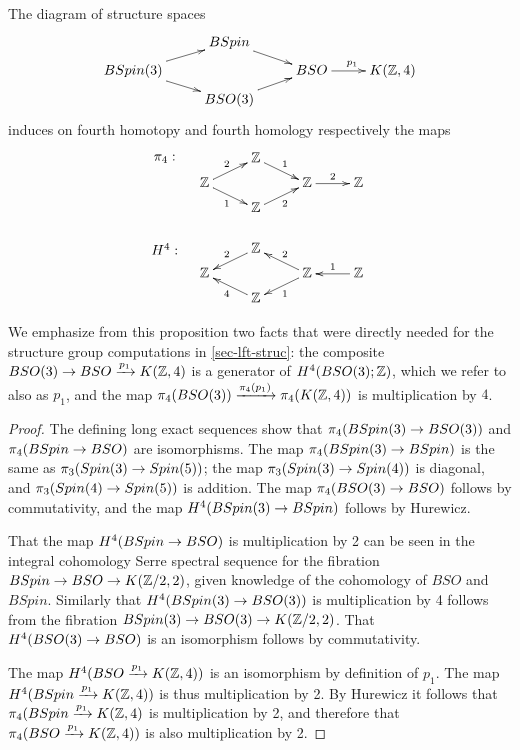 \documentclass{amsart}
\begin{document}
\begin{proposition} 
\label{prop-H4}
The diagram of structure spaces
\[
\xymatrix@R=5pt{
& BSpin \ar[dr] & & \\
BSpin(3) \ar[ur] \ar[dr] && BSO \ar[r]^{p_1} & K(\ZZ,4) \\
& BSO(3) \ar[ur] & &
}
\]
induces on fourth homotopy and fourth homology respectively the maps
\[
\xymatrix@R=5pt{
\save[]+<-1cm,0cm>*{\pi_4:}\restore & \ZZ \ar[dr]^{1} & & \\
\ZZ \ar[ur]^{2} \ar[dr]_{1} && \ZZ \ar[r]^{2} & \ZZ \\
& \ZZ \ar[ur]_{2} & & \\
&&& \\
\save[]+<-1cm,0cm>*{H^4:}\restore & \ZZ \ar[dl]_{2} & & \\
\ZZ && \ZZ \ar[ul]_{2} \ar[dl]^{1} & \ZZ \ar[l]_{1} \\
& \ZZ \ar[ul]^{4} & &
}
\]
\end{proposition}

We emphasize from this proposition two facts that were directly needed for the structure group computations in \cref{sec-lft-struc}: the composite $BSO(3) \rightarrow BSO \xrightarrow{p_1} K(\mathbb Z,4)$ is a generator of $H^4(BSO(3);\mathbb Z)$, which we refer to also as $p_1$, and the map $\pi_4(BSO(3)) \xrightarrow{\pi_4(p_1)} \pi_4(K(\mathbb Z,4))$ is multiplication by $4$.

\begin{proof}
The defining long exact sequences show that $\pi_4(BSpin(3) \rightarrow BSO(3))$ and $\pi_4(BSpin \rightarrow BSO)$ are isomorphisms.  The map $\pi_4(BSpin(3) \rightarrow BSpin)$ is the same as $\pi_3(Spin(3) \rightarrow Spin(5))$; the map $\pi_3(Spin(3) \rightarrow Spin(4))$ is diagonal, and $\pi_3(Spin(4) \rightarrow Spin(5))$ is addition. %
The map $\pi_4(BSO(3) \rightarrow BSO)$ follows by commutativity, and the map $H^4(BSpin(3) \rightarrow BSpin)$ follows by Hurewicz.

That the map $H^4(BSpin \rightarrow BSO)$ is multiplication by 2 can be seen in the integral cohomology Serre spectral sequence for the fibration $BSpin \rightarrow BSO \rightarrow K(\mathbb Z/2,2)$, given knowledge of the cohomology of $BSO$ and $BSpin$.  Similarly that $H^4(BSpin(3) \rightarrow BSO(3))$ is multiplication by 4 follows from the fibration $BSpin(3) \rightarrow BSO(3) \rightarrow K(\mathbb Z/2,2)$.  That $H^4(BSO(3) \rightarrow BSO)$ is an isomorphism follows by commutativity.

The map $H^4(BSO \xrightarrow{p_1} K(\mathbb Z,4))$ is an isomorphism by definition of $p_1$.  The map $H^4(BSpin \xrightarrow{p_1} K(\mathbb Z,4))$ is thus multiplication by 2.  By Hurewicz it follows that $\pi_4(BSpin \xrightarrow{p_1} K(\mathbb Z,4)$ is multiplication by 2, and therefore that $\pi_4(BSO \xrightarrow{p_1} K(\mathbb Z,4))$ is also multiplication by 2.
\end{proof}
\end{document}
